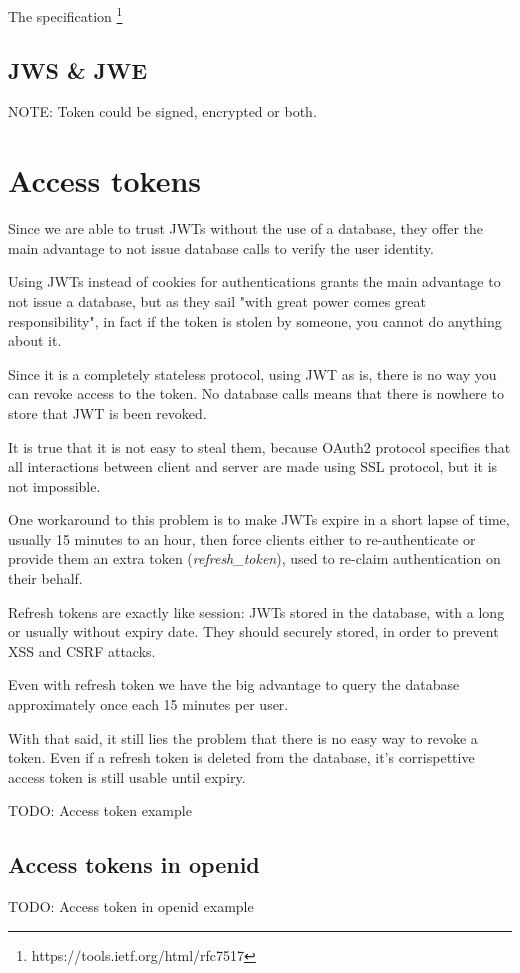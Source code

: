 \documentclass[11pt]{style}
\begin{document}
The specification \footnote{https://tools.ietf.org/html/rfc7517}

\subsection{JWS \& JWE}
NOTE: Token could be signed, encrypted or both.


\section{Access tokens}
Since we are able to trust JWTs  without the use of a database, they offer the
main advantage to not issue database calls to verify the user identity.


Using JWTs instead of cookies for authentications grants the main advantage to
not issue a database, but as they sail "with great power comes great
responsibility", in fact if the token is stolen by someone, you cannot do
anything about it.

Since it is a completely stateless protocol, using JWT as is, there is no way
you can revoke access to the token. No database calls means that there is
nowhere to store that JWT is been revoked.

It is true that it is not easy to steal them, because OAuth2 protocol specifies
that all interactions between client and server are made using SSL protocol, but
it is not impossible.

One workaround to this problem is to make JWTs expire in a short lapse of time,
usually 15 minutes to an hour, then force clients either to re-authenticate or
provide them an extra token (\textit{refresh\_token}), used to re-claim
authentication on their behalf.

Refresh tokens are exactly like session: JWTs stored in the database, with a
long or usually without expiry date.
They should securely stored, in order to prevent XSS and CSRF attacks.

Even with refresh token we have the big advantage to query the database
approximately once each 15 minutes per user.

With that said, it still lies the problem that there is no easy way to revoke a
token. Even if a refresh token is deleted from the database, it's corrispettive
access token is still usable until expiry.

TODO: Access token example
\subsection{Access tokens in openid}
TODO: Access token in openid example
\end{document}
